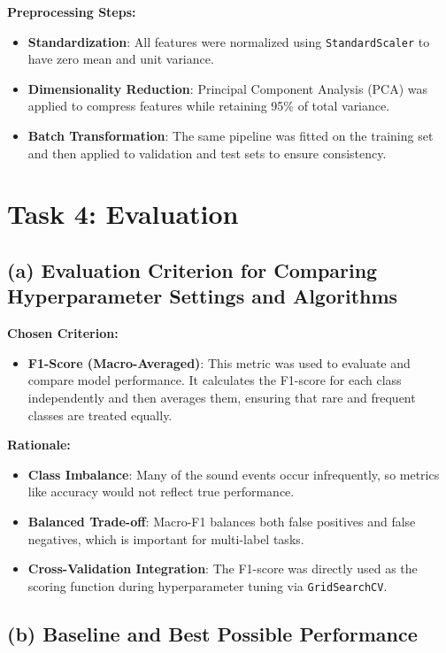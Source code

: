 \documentclass{article}
\begin{document}
\textbf{Preprocessing Steps:}
\begin{itemize}
    \item \textbf{Standardization}: All features were normalized using \texttt{StandardScaler} to have zero mean and unit variance.
    \item \textbf{Dimensionality Reduction}: Principal Component Analysis (PCA) was applied to compress features while retaining 95\% of total variance.
    \item \textbf{Batch Transformation}: The same pipeline was fitted on the training set and then applied to validation and test sets to ensure consistency.
\end{itemize}


\section*{Task 4: Evaluation}

\subsection*{(a) Evaluation Criterion for Comparing Hyperparameter Settings and Algorithms}

\textbf{Chosen Criterion:}
\begin{itemize}
    \item \textbf{F1-Score (Macro-Averaged)}: This metric was used to evaluate and compare model performance. It calculates the F1-score for each class independently and then averages them, ensuring that rare and frequent classes are treated equally.
\end{itemize}

\textbf{Rationale:}
\begin{itemize}
    \item \textbf{Class Imbalance}: Many of the sound events occur infrequently, so metrics like accuracy would not reflect true performance.
    \item \textbf{Balanced Trade-off}: Macro-F1 balances both false positives and false negatives, which is important for multi-label tasks.
    \item \textbf{Cross-Validation Integration}: The F1-score was directly used as the scoring function during hyperparameter tuning via \texttt{GridSearchCV}.
\end{itemize}

\subsection*{(b) Baseline and Best Possible Performance}
\end{document}
